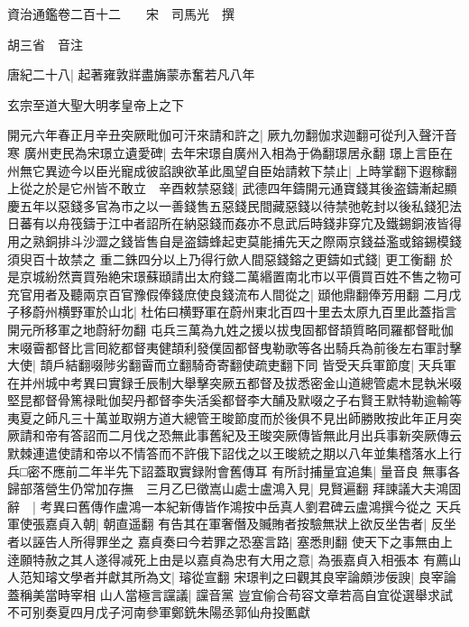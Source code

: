 資治通鑑卷二百十二　　宋　司馬光　撰

胡三省　音注

唐紀二十八|{
	起著雍敦牂盡㫋蒙赤奮若凡八年}


玄宗至道大聖大明孝皇帝上之下

開元六年春正月辛丑突厥毗伽可汗來請和許之|{
	厥九勿翻伽求迦翻可從刋入聲汗音寒}
廣州吏民為宋璟立遺愛碑|{
	去年宋璟自廣州入相為于偽翻璟居永翻}
璟上言臣在州無它異迹今以臣光寵成彼諂諛欲革此風望自臣始請敕下禁止|{
	上時掌翻下遐稼翻}
上從之於是它州皆不敢立　辛酉敕禁惡錢|{
	武德四年鑄開元通寶錢其後盗鑄漸起顯慶五年以惡錢多官為市之以一善錢售五惡錢民間藏惡錢以待禁弛乾封以後私錢犯法日蕃有以舟筏鑄于江中者詔所在納惡錢而姦亦不息武后時錢非穿宂及鐵錫銅液皆得用之熟銅排斗沙澀之錢皆售自是盗鑄蜂起吏莫能捕先天之際兩京錢益濫或鎔錫模錢須臾百十故禁之}
重二銖四分以上乃得行歛人間惡錢鎔之更鑄如式錢|{
	更工衡翻}
於是京城紛然賣買殆絶宋璟蘇頲請出太府錢二萬緡置南北市以平價買百姓不售之物可充官用者及聽兩京百官豫假俸錢庶使良錢流布人間從之|{
	頲他鼎翻俸芳用翻}
二月戊子移蔚州横野軍於山北|{
	杜佑曰横野軍在蔚州東北百四十里去太原九百里此蓋指言開元所移軍之地蔚紆勿翻}
屯兵三萬為九姓之援以拔曳固都督頡質略同羅都督毗伽末啜霫都督比言囘紇都督夷健頡利發僕固都督曳勒歌等各出騎兵為前後左右軍討擊大使|{
	頡戶結翻啜陟劣翻霫而立翻騎奇寄翻使疏吏翻下同}
皆受天兵軍節度|{
	天兵軍在并州城中考異曰實録壬辰制大舉擊突厥五都督及拔悉密金山道總管處木昆執米啜堅昆都督骨篤禄毗伽契丹都督李失活奚都督李大酺及默啜之子右賢王默特勒逾輸等夷夏之師凡三十萬並取朔方道大總管王晙節度而於後俱不見出師勝敗按此年正月突厥請和帝有答詔而二月伐之恐無此事舊紀及王晙突厥傳皆無此月出兵事新突厥傳云默棘連遣使請和帝以不情答而不許俄下詔伐之以王晙統之期以八年並集稽落水上行兵□密不應前二年半先下詔蓋取實録附會舊傳耳}
有所討捕量宜追集|{
	量音良}
無事各歸部落營生仍常加存撫　三月乙巳徵嵩山處士盧鴻入見|{
	見賢遍翻}
拜諫議大夫鴻固辭　|{
	考異曰舊傳作盧鴻一本紀新傳皆作鴻按中岳真人劉君碑云盧鴻撰今從之}
天兵軍使張嘉貞入朝|{
	朝直遥翻}
有告其在軍奢僭及贓賄者按驗無狀上欲反坐吿者|{
	反坐者以誣告人所得罪坐之}
嘉貞奏曰今若罪之恐塞言路|{
	塞悉則翻}
使天下之事無由上逹願特赦之其人遂得减死上由是以嘉貞為忠有大用之意|{
	為張嘉貞入相張本}
有薦山人范知璿文學者并獻其所為文|{
	璿從宣翻}
宋璟判之曰觀其良宰論頗涉佞諛|{
	良宰論蓋稱美當時宰相}
山人當極言讜議|{
	讜音黨}
豈宜偷合苟容文章若高自宜從選舉求試不可别奏夏四月戊子河南參軍鄭銑朱陽丞郭仙舟投匭獻

